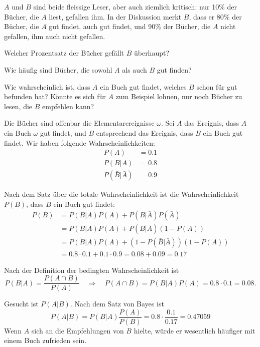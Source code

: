 $A$ und $B$ sind beide fleissige Leser, aber auch ziemlich
kritisch: nur 10\% der Bücher, die $A$ liest, gefallen ihm.
In der Diskussion merkt
$B$, dass er 80\% der Bücher, die $A$ gut findet, auch gut findet,
und 90\% der Bücher, die $A$ nicht gefallen, ihm auch nicht
gefallen.
\begin{teilaufgaben}
\item Welcher Prozentsatz der Bücher gefällt $B$ überhaupt?
\item Wie häufig sind Bücher, die sowohl $A$ als auch $B$ gut finden?
\item Wie wahrscheinlich ist, dass $A$ ein Buch gut findet, welches
$B$ schon für gut befunden hat? Könnte es sich für $A$ zum Beispiel
lohnen, nur noch Bücher zu lesen, die $B$ empfehlen kann?
\end{teilaufgaben}

\begin{loesung}
Die Bücher sind offenbar die Elementarereignisse $\omega$.
Sei $A$ das Ereignis, dass $A$ ein Buch $\omega$ gut findet,
und $B$ entsprechend das Ereignis, dass $B$ ein Buch gut findet.
Wir haben folgende Wahrscheinlichkeiten:
\begin{align*}
P(A)&=0.1\\
P(B|A)&=0.8\\
P(\bar B|\bar A)&=0.9
\end{align*}
\begin{teilaufgaben}
\item
Nach dem Satz über die totale Wahrscheinlichkeit ist die Wahrscheinlichkeit
$P(B)$, dass $B$ ein Buch gut findet:
\begin{align*}
P(B)
&=
P(B|A)P(A) + P(B|\bar A)P(\bar A)
\\
&=
P(B|A)P(A) + P(B|\bar A)(1-P(A))
\\
&=
P(B|A)P(A) + (1-P(\bar B|\bar A))(1-P(A))
\\
&=
0.8\cdot 0.1+0.1\cdot 0.9=0.08 + 0.09=0.17
\end{align*}
\item
Nach der Definition der bedingten Wahrscheinlichkeit
ist 
\[
P(B|A)=\frac{P(A\cap B)}{P(A)}
\quad\Rightarrow\quad
P(A\cap B)=P(B|A)P(A)=0.8\cdot 0.1=0.08.
\]
\item Gesucht ist $P(A|B)$. Nach dem Satz von Bayes ist
\[
P(A|B)=P(B|A)\frac{P(A)}{P(B)}=0.8\cdot\frac{0.1}{0.17}=0.47059
\]
Wenn $A$ sich an die Empfehlungen von $B$ hielte, würde er wesentlich
häufiger mit einem Buch zufrieden sein.
\qedhere
\end{teilaufgaben}
\end{loesung}

